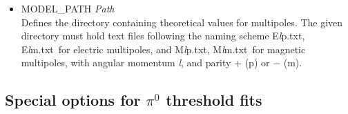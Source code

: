 \documentclass[a4paper,10pt]{article}
\def\tt{\ttfamily}
\def\rm{\rmfamily}
\begin{document}
\begin{itemize}
\item
\tt MODEL\_PATH \textit{Path}\rm\\
Defines the directory containing theoretical values for multipoles. The given directory must hold text files
following the naming scheme \tt E\textit{l}p.txt\rm,
\tt E\textit{l}m.txt\rm\ 
for electric multipoles, and
\tt M\textit{l}p.txt\rm,
\tt M\textit{l}m.txt\rm\ 
for magnetic multipoles, with angular momentum \tt\textit{l}\rm, and parity 
$+$ (\tt p\rm) or $-$ (\tt m\rm).

\end{itemize}

\subsection{Special options for $\pi^0$ threshold fits}
\end{document}
